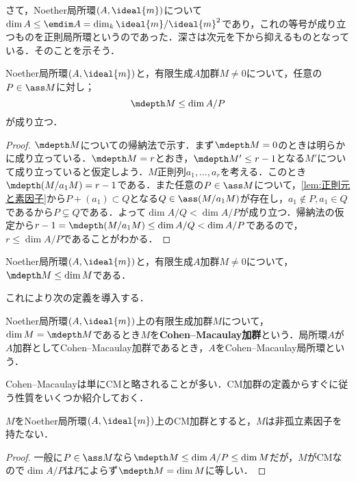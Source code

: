 
さて，Noether局所環$(A,\ideal{m})$について$\dim A\leq \emdim A=\dim_k\ideal{m}/\ideal{m}^2$であり，これの等号が成り立つものを正則局所環というのであった．深さは次元を下から抑えるものとなっている．そのことを示そう．

\begin{prop}\label{prop:depth M<=dim A/P}
	Noether局所環$(A,\ideal{m})$と，有限生成$A$加群$M\neq0$について，任意の$P\in\ass M$に対し；
	\[\mdepth M\leq\dim A/P\]
	が成り立つ．
\end{prop}

\begin{proof}
	$\mdepth M$についての帰納法で示す．まず$\mdepth M=0$のときは明らかに成り立っている．$\mdepth M=r$とおき，$\mdepth M'\leq r-1$となる$M'$について成り立っていると仮定しよう．$M$正則列$a_1,\dots,a_r$を考える．このとき$\mdepth (M/a_1M)=r-1$である．また任意の$P\in\ass M$について，\ref{lem:正則元と素因子}から$P+(a_1)\subset Q$となる$Q\in\ass (M/a_1M)$が存在し，$a_1\not\in P,a_1\in Q$であるから$P\subsetneq Q$である．よって$\dim A/Q<\dim A/P$が成り立つ．帰納法の仮定から$r-1=\mdepth (M/a_1M)\leq\dim A/Q<\dim A/P$であるので，$r\leq\dim A/P$であることがわかる． 
\end{proof}

\begin{cor}
	Noether局所環$(A,\ideal{m})$と，有限生成$A$加群$M\neq0$について，$\mdepth M\leq\dim M$である．
\end{cor}

これにより次の定義を導入する．

\begin{defi}
	Noether局所環$(A,\ideal{m})$上の有限生成加群$M$について，$\dim M=\mdepth M$であるとき$M$を\textbf{Cohen--Macaulay加群}という．局所環$A$が$A$加群としてCohen--Macaulay加群であるとき，$A$をCohen--Macaulay局所環という．
\end{defi}

Cohen--Macaulayは単にCMと略されることが多い．CM加群の定義からすぐに従う性質をいくつか紹介しておく．
\begin{prop}\label{prop:CM加群は非孤立素因子を持たない}
	$M$をNoether局所環$(A,\ideal{m})$上のCM加群とすると，$M$は非孤立素因子を持たない．
\end{prop}

\begin{proof}
	一般に$P\in\ass M$なら$\mdepth M\leq\dim A/P\leq\dim M$だが，$M$がCMなので$\dim A/P$は$P$によらず$\mdepth M=\dim M$に等しい．
\end{proof}

